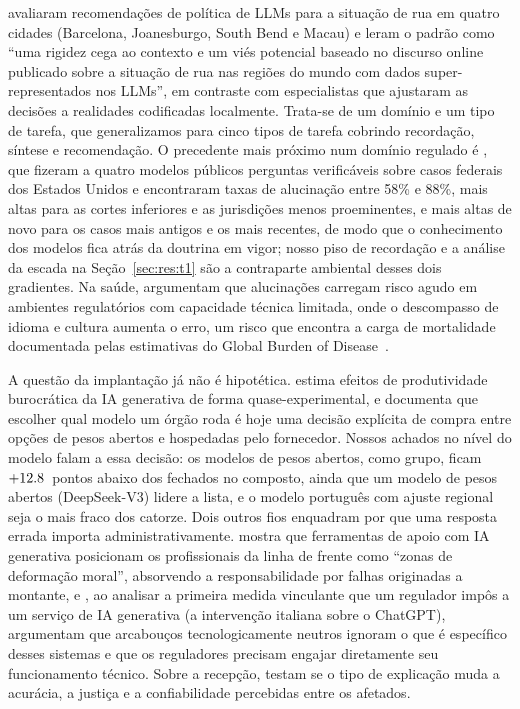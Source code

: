 \citet{lecoz2025policymaking} avaliaram recomendações de política de LLMs
para a situação de rua em quatro cidades (Barcelona, Joanesburgo, South Bend e
Macau) e leram o padrão como ``uma rigidez cega ao contexto e um viés potencial
baseado no discurso online publicado sobre a situação de rua nas regiões do
mundo com dados super-representados nos LLMs'', em contraste com especialistas
que ajustaram as decisões a realidades codificadas localmente. Trata-se de um
domínio e um tipo de tarefa, que generalizamos para cinco tipos de tarefa
cobrindo recordação, síntese e recomendação. O precedente mais próximo num
domínio regulado é \citet{dahl2024legal}, que fizeram a quatro modelos públicos
perguntas verificáveis sobre casos federais dos Estados Unidos e encontraram
taxas de alucinação entre 58\% e 88\%, mais altas para as cortes inferiores e
as jurisdições menos proeminentes, e mais altas de novo para os casos mais
antigos e os mais recentes, de modo que o conhecimento dos modelos fica atrás
da doutrina em vigor; nosso piso de recordação e a análise da escada na
Seção~\ref{sec:res:t1} são a contraparte ambiental desses dois gradientes. Na
saúde, \citet{kozlakidis2026medical} argumentam que alucinações carregam risco agudo
em ambientes regulatórios com capacidade técnica limitada, onde o descompasso
de idioma e cultura aumenta o erro, um risco que encontra a carga de
mortalidade documentada pelas estimativas do Global Burden of
Disease~\citep{gbd2019risk}.

A questão da implantação já não é hipotética. \citet{kim2026genai} estima
efeitos de produtividade burocrática da IA generativa de forma
quase-experimental, e \citet{robinson2026opensource} documenta que escolher
qual modelo um órgão roda é hoje uma decisão explícita de compra entre opções
de pesos abertos e hospedadas pelo fornecedor. Nossos achados no nível do
modelo falam a essa decisão: os modelos de pesos abertos, como grupo, ficam
$+12.8$~pontos abaixo dos fechados no composto, ainda que um modelo de pesos
abertos (DeepSeek-V3) lidere a lista, e o modelo português com ajuste regional
seja o mais fraco dos catorze. Dois outros fios enquadram por que uma resposta
errada importa administrativamente. \citet{choroszewicz2026crumple} mostra que
ferramentas de apoio com IA generativa posicionam os profissionais da linha de
frente como ``zonas de deformação moral'', absorvendo a responsabilidade por
falhas originadas a montante, e \citet{cordella2024regulating}, ao analisar a
primeira medida vinculante que um regulador impôs a um serviço de IA generativa
(a intervenção italiana sobre o ChatGPT), argumentam que arcabouços
tecnologicamente neutros ignoram o que é específico desses sistemas e que os
reguladores precisam engajar diretamente seu funcionamento técnico. Sobre a
recepção, \citet{aoki2024explainable} testam se o tipo de explicação muda a
acurácia, a justiça e a confiabilidade percebidas entre os afetados.

